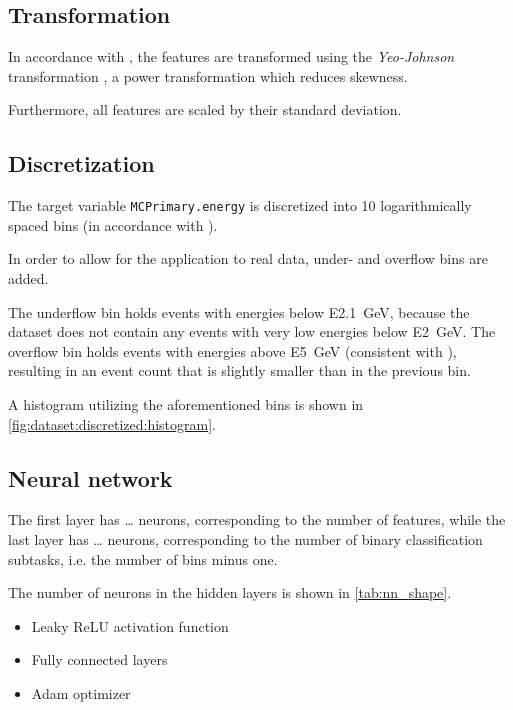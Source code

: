 \subsection{Transformation}
In accordance with \cite{dsea_jan},
the features are transformed using the \emph{Yeo-Johnson} transformation \cite{yeo_johnson},
a power transformation which reduces skewness.

Furthermore, all features are scaled by their standard deviation.




\subsection{Discretization}
The target variable \texttt{MCPrimary.energy} is discretized into \num{10} logarithmically spaced bins
(in accordance with \cite{dsea_samuel}).

In order to allow for the application to real data,
under- and overflow bins are added.

The underflow bin holds events with energies below \SI{E2.1}{\giga\electronvolt},
because the dataset does not contain any events with very low energies below \SI{E2}{\giga\electronvolt}.
The overflow bin holds events with energies above \SI{E5}{\giga\electronvolt}
  (consistent with \cite{dsea_samuel}),
resulting in an event count that is slightly smaller than in the previous bin.

A histogram utilizing the aforementioned bins is shown in \autoref{fig:dataset:discretized:histogram}.


\subsection{Neural network}
The first layer has … neurons,
  corresponding to the number of features,
while the last layer has … neurons,
  corresponding to the number of binary classification subtasks,
    i.e. the number of bins minus one.

The number of neurons in the hidden layers is shown in \autoref{tab:nn_shape}.
\begin{itemize}
  \item Leaky ReLU activation function
  \item Fully connected layers
  \item Adam optimizer
\end{itemize}

